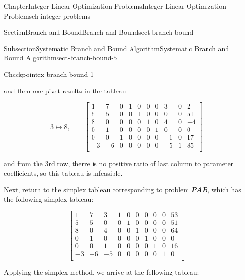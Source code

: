 \documentclass[oneside,10pt,]{book}
\newcommand{\alert}[1]{\textbf{\textit{#1}}}
\numberwithin{equation}{section}
\newcommand{\amp}{&}
\begin{document}
\begin{chapterptx}{Chapter}{Integer Linear Optimization Problems}{}{Integer Linear Optimization Problems}{}{}{ch-integer-problems}
\begin{sectionptx}{Section}{Branch and Bound}{}{Branch and Bound}{}{}{sect-branch-bound}
\begin{subsectionptx}{Subsection}{Systematic Branch and Bound Algorithm}{}{Systematic Branch and Bound Algorithm}{}{}{sect-branch-bound-5}
\begin{inlineexercise}{Checkpoint}{}{ex-branch-bound-1}
\begin{equation*}
\end{equation*}
%
\par
and then one pivot results in the tableau%
\par
%
\begin{equation*}
3 \mapsto 8, \qquad \left[\begin{array}{rrr|rrrrrr|r} 1 \amp 7 \amp 0 \amp 1 \amp 0 \amp 0 \amp 0 \amp 3 \amp 0 \amp 2\\ 5 \amp 5 \amp 0 \amp 0 \amp 1 \amp 0 \amp 0 \amp 0 \amp 0 \amp 51\\ 8 \amp 0 \amp 0 \amp 0 \amp 0 \amp 1 \amp 0 \amp 4 \amp 0 \amp -4\\ 0 \amp 1 \amp 0 \amp 0 \amp 0 \amp 0 \amp 1 \amp 0 \amp 0 \amp 0\\ 0 \amp 0 \amp 1 \amp 0 \amp 0 \amp 0 \amp 0 \amp -1 \amp 0 \amp 17\\ \hline -3 \amp -6 \amp 0 \amp 0 \amp 0 \amp 0 \amp 0 \amp -5 \amp 1 \amp 85\\ \end{array} \right]
\end{equation*}
%
\par
and from the 3rd row, therre is no positive ratio of last column to parameter coefficients, so this tableau is infeasible.%
\par
Next, return to the simplex tableau corresponding to problem \alert{PAB}, which has the following simplex tableau:%
\par
%
\begin{equation*}
\left[\begin{array}{rrr|rrrrrr|r} 1 \amp 7 \amp 3 \amp 1 \amp 0 \amp 0 \amp 0 \amp 0 \amp 0 \amp 53\\ 5 \amp 5 \amp 0 \amp 0 \amp 1 \amp 0 \amp 0 \amp 0 \amp 0 \amp 51\\ 8 \amp 0 \amp 4 \amp 0 \amp 0 \amp 1 \amp 0 \amp 0 \amp 0 \amp 64\\ 0 \amp 1 \amp 0 \amp 0 \amp 0 \amp 0 \amp 1 \amp 0 \amp 0 \amp 0\\ 0 \amp 0 \amp 1 \amp 0 \amp 0 \amp 0 \amp 0 \amp 1 \amp 0 \amp 16\\ \hline -3 \amp -6 \amp -5 \amp 0 \amp 0 \amp 0 \amp 0 \amp 0 \amp 1 \amp 0\\ \end{array} \right]
\end{equation*}
%
\par
Applying the simplex method, we arrive at the following tableau:%
\par
%
\begin{equation*}

\end{equation*}
\end{inlineexercise}
\end{subsectionptx}
\end{sectionptx}
\end{chapterptx}
\end{document}
